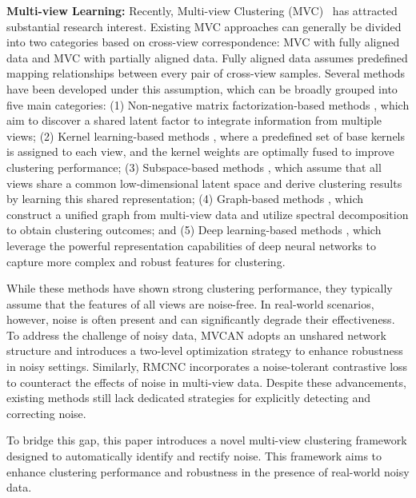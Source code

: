 \documentclass{article}
\theoremstyle{plain}
\theoremstyle{definition}
\theoremstyle{remark}
\begin{document}
\textbf{{Multi-view Learning:}}
Recently, Multi-view Clustering (MVC)~\cite{wan1, wan2, dong1,dong2,ysj1, ysj2,ysj3,li1,li2,zheng1} has attracted substantial research interest. Existing MVC approaches can generally be divided into two categories based on cross-view correspondence: MVC with fully aligned data and MVC with partially aligned data. Fully aligned data assumes predefined mapping relationships between every pair of cross-view samples. Several methods have been developed under this assumption, which can be broadly grouped into five main categories: (1) Non-negative matrix factorization-based methods \cite{wenjie_mf}, which aim to discover a shared latent factor to integrate information from multiple views; (2) Kernel learning-based methods \cite{one}, where a predefined set of base kernels is assigned to each view, and the kernel weights are optimally fused to improve clustering performance; (3) Subspace-based methods \cite{suyuan_AAAI}, which assume that all views share a common low-dimensional latent space and derive clustering results by learning this shared representation; (4) Graph-based methods \cite{graph_mvc}, which construct a unified graph from multi-view data and utilize spectral decomposition to obtain clustering outcomes; and (5) Deep learning-based methods \cite{DealMVC}, which leverage the powerful representation capabilities of deep neural networks to capture more complex and robust features for clustering.  

While these methods have shown strong clustering performance, they typically assume that the features of all views are noise-free. In real-world scenarios, however, noise is often present and can significantly degrade their effectiveness. To address the challenge of noisy data, MVCAN \cite{MVCAN} adopts an unshared network structure and introduces a two-level optimization strategy to enhance robustness in noisy settings. Similarly, RMCNC \cite{sun2024robust} incorporates a noise-tolerant contrastive loss to counteract the effects of noise in multi-view data. Despite these advancements, existing methods still lack dedicated strategies for explicitly detecting and correcting noise.  

To bridge this gap, this paper introduces a novel multi-view clustering framework designed to automatically identify and rectify noise. This framework aims to enhance clustering performance and robustness in the presence of real-world noisy data.
\end{document}
